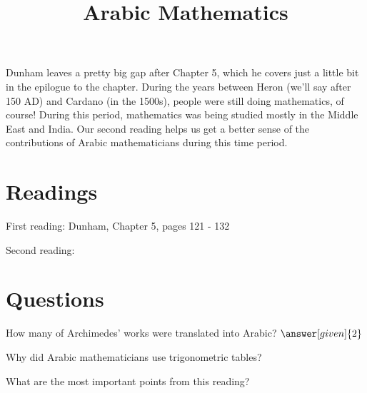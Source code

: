 \documentclass[nooutcomes]{ximera}
\title{Arabic Mathematics}
\begin{document}
\begin{abstract}
    
\end{abstract}
\maketitle

Dunham leaves a pretty big gap after Chapter 5, which he covers just a little bit in the epilogue to the chapter.  During the years between Heron (we'll say after 150 AD) and Cardano (in the 1500s), people were still doing mathematics, of course!  During this period, mathematics was being studied mostly in the Middle East and India.  Our second reading helps us get a better sense of the contributions of Arabic mathematicians during this time period.


\section{Readings}
First reading: Dunham, Chapter 5, pages 121 - 132 

Second reading: 

\section{Questions}

\begin{question}
How many of Archimedes' works were translated into Arabic? $\answer[given]{2}$
\end{question}

\begin{question}
Why did Arabic mathematicians use trigonometric tables?
\begin{multipleChoice}
\end{multipleChoice}
\end{question}


\begin{question}
What are the most important points from this reading?
\begin{freeResponse}
\end{freeResponse}

\end{question}
\end{document}
